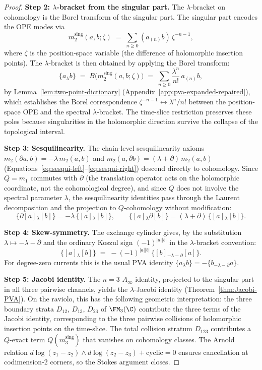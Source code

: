 \begin{proof}
\medskip\noindent\textbf{Step 2: $\lambda$-bracket from the singular part.}
The $\lambda$-bracket on cohomology is the Borel transform of the
singular part. The singular part encodes the OPE modes via
\[
 m_2^{\mathrm{sing}}(a,b;\zeta) \;=\; \sum_{n \ge 0} (a_{(n)}b)\,\zeta^{-n-1},
\]
where $\zeta$ is the position-space variable (the difference of holomorphic insertion points). The $\lambda$-bracket is then obtained by applying the Borel transform:
\[
 \{a{}_\lambda b\} \;=\; B\bigl(m_2^{\mathrm{sing}}(a,b;\zeta)\bigr) \;=\; \sum_{n \ge 0} \frac{\lambda^n}{n!}\, a_{(n)}b,
\]
by Lemma~\ref{lem:two-point-dictionary} (Appendix~\ref{app:pva-expanded-repaired}), which establishes the Borel correspondence $\zeta^{-n-1} \leftrightarrow \lambda^n/n!$ between the position-space OPE and the spectral $\lambda$-bracket. The time-slice restriction preserves these poles because singularities in the holomorphic direction survive the collapse of the topological interval.

\medskip\noindent\textbf{Step 3: Sesquilinearity.}
The chain-level sesquilinearity axioms $m_2(\partial a, b) = -\lambda\, m_2(a,b)$ and $m_2(a, \partial b) = (\lambda+\partial)\,m_2(a,b)$ (Equations~\ref{eq:sesqui-left}--\ref{eq:sesqui-right}) descend directly to cohomology. Since $Q=m_1$ commutes with $\partial$ (the translation operator acts on the holomorphic coordinate, not the cohomological degree), and since $Q$ does not involve the spectral parameter $\lambda$, the sesquilinearity identities pass through the Laurent decomposition and the projection to $Q$-cohomology without modification:
\[
 \{\partial[a]{}_\lambda [b]\} = -\lambda\,\{[a]{}_\lambda [b]\}, \qquad
 \{[a]{}_\lambda \partial[b]\} = (\lambda+\partial)\,\{[a]{}_\lambda [b]\}.
\]

\medskip\noindent\textbf{Step 4: Skew-symmetry.}
The exchange cylinder gives, by the substitution
$\lambda\mapsto -\lambda-\partial$ and the ordinary Koszul sign
$(-1)^{|a||b|}$ in the $\lambda$-bracket convention:
\[
 \{[a]{}_\lambda [b]\} \;=\; -(-1)^{|a||b|}\,\{[b]{}_{-\lambda-\partial} [a]\}.
\]
For degree-zero currents this is the usual PVA identity
$\{a_\lambda b\}=-\{b_{-\lambda-\partial}a\}$.

\medskip\noindent\textbf{Step 5: Jacobi identity.}
The $n=3$ $A_\infty$ identity, projected to the singular part in all three pairwise channels, yields the $\lambda$-Jacobi identity (Theorem~\ref{thm:Jacobi-PVA}). On the raviolo, this has the following geometric interpretation: the three boundary strata $D_{12}$, $D_{13}$, $D_{23}$ of $\FM_3(\C)$ contribute the three terms of the Jacobi identity, corresponding to the three pairwise collisions of holomorphic insertion points on the time-slice. The total collision stratum $D_{123}$ contributes a $Q$-exact term $Q(m_3^{\mathrm{sing}})$ that vanishes on cohomology classes. The Arnold relation $d\log(z_1-z_2)\wedge d\log(z_2-z_3) + \text{cyclic} = 0$ ensures cancellation at codimension-2 corners, so the Stokes argument closes.


\end{proof}
